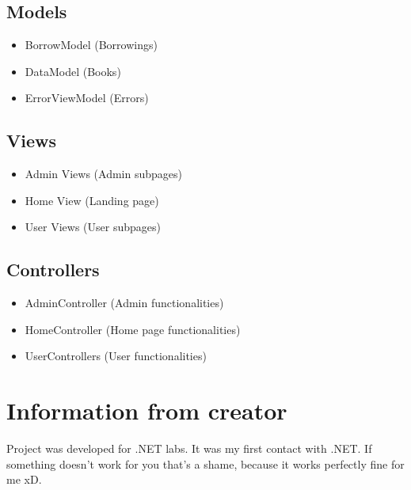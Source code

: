 \documentclass[a4paper,12pt,oneside]{article}
\begin{document}
	\newpage
	
	\subsection{Models}
	\begin{itemize}
		\item  BorrowModel (Borrowings) 
		\item  DataModel (Books)
		\item  ErrorViewModel (Errors)
	\end{itemize}

	\subsection{Views}
	\begin{itemize}
		\item  Admin Views (Admin subpages) 
		\item  Home View (Landing page)
		\item  User Views (User subpages)
	\end{itemize}

	\subsection{Controllers}
	\begin{itemize}
		\item  AdminController (Admin functionalities) 
		\item  HomeController (Home page functionalities)
		\item  UserControllers (User functionalities)
	\end{itemize}
	
	\section{Information from creator}
	Project was developed for .NET labs. It was my first contact with .NET. If something doesn't work for you that's a shame, because it works perfectly fine for me xD.
	
\end{document}
